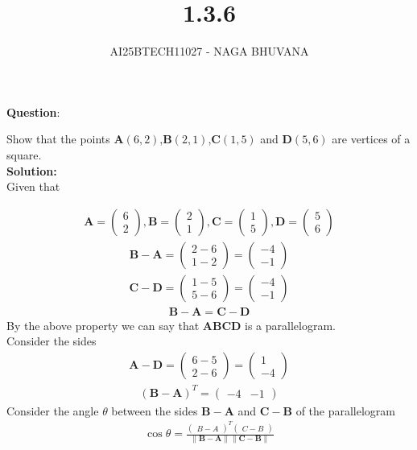\documentclass{beamer}
\title{1.3.6}
\author{AI25BTECH11027 - NAGA BHUVANA}
\providecommand{\brak}[1]{\ensuremath{\left(#1\right)}}
\theoremstyle{remark}
\newcommand{\myvec}[1]{\ensuremath{\begin{pmatrix}#1\end{pmatrix}}}
\let\vec\mathbf
\numberwithin{equation}{section}
\begin{document}
{\let\newpage\relax\maketitle}
\renewcommand{\thefigure}{\theenumi}
\renewcommand{\thetable}{\theenumi}
		\textbf{Question}:

		\noindent Show that the points $\vec{A}\brak{6,2}$,$\vec{B}\brak{2,1}$,$\vec{C}\brak{1,5}$ and $\vec{D}\brak{5,6}$ are vertices of a square.\\
		\textbf{Solution:}\\
       
      Given that


		\begin{align}
			\vec{A} = \myvec{6\\2} ,\vec{B}=\myvec{2\\1} ,\vec{C}=\myvec{1\\5} , \vec{D}=\myvec{5\\6}
		\end{align}
		\begin{align}
		    \vec{B}-\vec{A}=\myvec{2-6\\1-2}=\myvec{-4\\-1}
		\end{align}
        \begin{align}
            \vec{C}-\vec{D}=\myvec{1-5\\5-6}=\myvec{-4\\-1}
        \end{align}
        \begin{align}
            \vec{B}-\vec{A}=\vec{C}-\vec{D}
        \end{align}
        By the above property we can say that \textbf{ABCD} is a parallelogram.\\
        Consider the sides\\
        \begin{align}
            \vec{A-D}=\myvec{6-5\\2-6}=\myvec{1\\-4}
        \end{align}
        \begin{align}
            \vec{(B-A)}^T=\myvec{-4 & -1}
        \end{align}
      Consider the angle $\theta$ between the sides $\vec{B-A}$ and $\vec{C-B}$ of the parallelogram\\
      \begin{align}
      \cos{\theta}=\frac{\myvec{B-A}^T\myvec{C-B}}{\|\vec{B-A}\|\|\vec{C-B}\|}
      \end{align}
\end{document}
